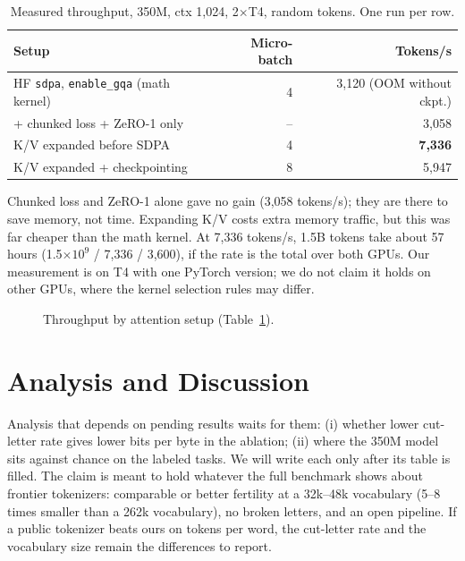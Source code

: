 \documentclass[11pt]{article}
\begin{document}
\begin{table}[t]
\centering
\small
\begin{tabular}{lrr}
\toprule
Setup & Micro-batch & Tokens/s \\
\midrule
HF \texttt{sdpa}, \texttt{enable\_gqa} (math kernel) & 4 & 3,120 (OOM without ckpt.) \\
+ chunked loss + ZeRO-1 only & -- & 3,058 \\
K/V expanded before SDPA & 4 & \textbf{7,336} \\
K/V expanded + checkpointing & 8 & 5,947 \\
\bottomrule
\end{tabular}
\caption{Measured throughput, 350M, ctx 1,024, 2$\times$T4, random tokens. One run per row.}
\label{tab:speed}
\end{table}

Chunked loss and ZeRO-1 alone gave no gain (3,058 tokens/s); they are there to save memory, not time.
Expanding K/V costs extra memory traffic, but this was far cheaper than the math kernel.
At 7,336 tokens/s, 1.5B tokens take about 57 hours (1.5$\times10^9$ / 7,336 / 3,600), if the rate is the total over both GPUs.
Our measurement is on T4 with one PyTorch version; we do not claim it holds on other GPUs, where the kernel selection rules may differ.

\begin{figure}[t]
\centering
{}
\caption{Throughput by attention setup (Table~\ref{tab:speed}).}
\label{fig:speed}
\end{figure}

\section{Analysis and Discussion}
\label{sec:analysis}
Analysis that depends on pending results waits for them: (i) whether lower cut-letter rate gives lower bits per byte in the ablation; (ii) where the 350M model sits against chance on the labeled tasks.
We will write each only after its table is filled.
The claim is meant to hold whatever the full benchmark shows about frontier tokenizers: comparable or better fertility at a 32k--48k vocabulary (5--8 times smaller than a 262k vocabulary), no broken letters, and an open pipeline.
If a public tokenizer beats ours on tokens per word, the cut-letter rate and the vocabulary size remain the differences to report.
\end{document}
